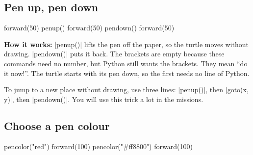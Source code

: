\subsection*{Pen up, pen down}

\begin{tcbraster}[raster columns=2, raster equal height=rows, raster column skip=12pt, raster valign=center]
\begin{tcolorbox}[colback=white, colframe=white, boxrule=0pt, valign=center]
\begin{scratch}
\end{scratch}
\end{tcolorbox}
\begin{code}
forward(50)
penup()
forward(50)
pendown()
forward(50)
\end{code}
\end{tcbraster}

\textbf{How it works:} \py|penup()| lifts the pen off the paper, so the turtle moves without drawing. \py|pendown()| puts it back. The brackets are empty because these commands need no number, but Python still wants the brackets. They mean ``do it now!''. The turtle starts with its pen down, so the first  needs no line of Python.

\begin{think}
To jump to a new place without drawing, use three lines: \py|penup()|, then \py|goto(x, y)|, then \py|pendown()|. You will use this trick a lot in the missions.
\end{think}

\subsection*{Choose a pen colour}

\begin{tcbraster}[raster columns=2, raster equal height=rows, raster column skip=12pt, raster valign=center]
\begin{tcolorbox}[colback=white, colframe=white, boxrule=0pt, valign=center]
\begin{scratch}
\end{scratch}
\end{tcolorbox}
\begin{code}
pencolor("red")
forward(100)
pencolor("#ff8800")
forward(100)
\end{code}
\end{tcbraster}

